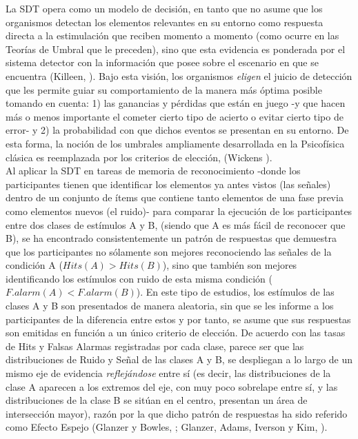 La SDT opera como un modelo de decisión, en tanto que no asume que los organismos detectan los elementos relevantes en su entorno como respuesta directa a la estimulación que reciben momento a momento (como ocurre en las Teorías de Umbral que le preceden), sino que esta evidencia es ponderada por el sistema detector con la información que posee sobre el escenario en que se encuentra (Killeen, \citeyear{Killeen2014}). Bajo esta visión, los organismos \textit{eligen} el juicio de detección que les permite guiar su comportamiento de la manera más óptima posible tomando en cuenta: 1) las ganancias y pérdidas que están en juego -y que hacen más o menos importante el cometer cierto tipo de acierto o evitar cierto tipo de error- y 2) la probabilidad con que dichos eventos se presentan en su entorno. De esta forma, la noción de los umbrales ampliamente desarrollada en la Psicofísica clásica es reemplazada por los criterios de elección, (Wickens \citeyear{Wickens1}).\\ 

Al aplicar la SDT en tareas de memoria de reconocimiento -donde los participantes tienen que identificar los elementos ya antes vistos (las señales) dentro de un conjunto de ítems que contiene tanto elementos de una fase previa como elementos nuevos (el ruido)- para comparar la ejecución de los participantes entre dos clases de estímulos A y B, (siendo que A es más fácil de reconocer que B), se ha encontrado consistentemente un patrón de respuestas que demuestra que los participantes no sólamente son mejores reconociendo las señales de la condición A ($Hits(A)>Hits(B)$), sino que también son mejores identificando los estímulos con ruido de esta misma condición ($F.alarm(A)<F.alarm(B)$). En este tipo de estudios, los estímulos de las clases A y B son presentados de manera aleatoria, sin que se les informe a los participantes de la diferencia entre estos y por tanto, se asume que sus respuestas son emitidas en función a un único criterio de elección. De acuerdo con las tasas de Hits y Falsas Alarmas registradas por cada clase, parece ser que las distribuciones de Ruido y Señal de las clases A y B, se despliegan a lo largo de un mismo eje de evidencia \textit{reflejándose} entre sí (es decir, las distribuciones de la clase A aparecen a los extremos del eje, con muy poco sobrelape entre sí, y las distribuciones de la clase B se sitúan  en el centro, presentan un área de intersección mayor), razón por la que dicho patrón de respuestas ha sido referido como Efecto Espejo (Glanzer y Bowles, \citeyear{Glanzer1976}; Glanzer, Adams, Iverson y Kim, \citeyear{Glanzer1993}).\\

